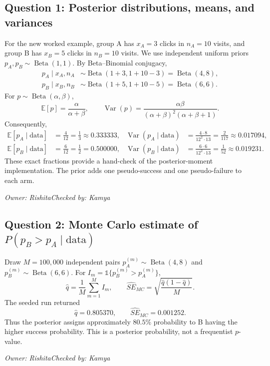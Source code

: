 \documentclass[11pt]{article}
\newcommand{\signoff}[2]{\par\smallskip\noindent\textit{Owner: #1\quad Checked by: #2}\par}
\newcommand{\E}{\mathbb{E}}
\newcommand{\Var}{\operatorname{Var}}
\newcommand{\Beta}{\operatorname{Beta}}
\begin{document}
\subsection{Question 1: Posterior distributions, means, and variances}
For the new worked example, group A has $x_A=3$ clicks in $n_A=10$ visits, and group B has $x_B=5$ clicks in $n_B=10$ visits. We use independent uniform priors $p_A,p_B\sim\Beta(1,1)$. By Beta--Binomial conjugacy,
\begin{align*}
p_A\mid x_A,n_A&\sim\Beta(1+3,1+10-3)=\boxed{\Beta(4,8)},\\
p_B\mid x_B,n_B&\sim\Beta(1+5,1+10-5)=\boxed{\Beta(6,6)}.
\end{align*}
For $p\sim\Beta(\alpha,\beta)$,
\[
\E[p]=\frac{\alpha}{\alpha+\beta},\qquad
\Var(p)=\frac{\alpha\beta}{(\alpha+\beta)^2(\alpha+\beta+1)}.
\]
Consequently,
\begin{align*}
\E[p_A\mid\text{data}]&=\frac4{12}=\boxed{\frac13\approx0.333333},&
\Var(p_A\mid\text{data})&=\frac{4\cdot8}{12^2\cdot13}=\boxed{\frac{2}{117}\approx0.017094},\\
\E[p_B\mid\text{data}]&=\frac6{12}=\boxed{\frac12=0.500000},&
\Var(p_B\mid\text{data})&=\frac{6\cdot6}{12^2\cdot13}=\boxed{\frac1{52}\approx0.019231}.
\end{align*}
These exact fractions provide a hand-check of the posterior-moment implementation. The prior adds one pseudo-success and one pseudo-failure to each arm.

\signoff{Rishita}{Kamya}

\subsection{Question 2: Monte Carlo estimate of $P(p_B>p_A\mid\mathrm{data})$}
Draw $M=100{,}000$ independent pairs $p_A^{(m)}\sim\Beta(4,8)$ and $p_B^{(m)}\sim\Beta(6,6)$. For $I_m=\mathbb{1}\{p_B^{(m)}>p_A^{(m)}\}$,
\[
\hat q=\frac1M\sum_{m=1}^M I_m,\qquad
\widehat{SE}_{MC}=\sqrt{\frac{\hat q(1-\hat q)}M}.
\]
The seeded run returned
\[
\boxed{\hat q=0.805370},\qquad
\boxed{\widehat{SE}_{MC}=0.001252}.
\]
Thus the posterior assigns approximately $80.5\%$ probability to B having the higher success probability. This is a posterior probability, not a frequentist $p$-value.

\signoff{Rishita}{Kamya}
\end{document}
